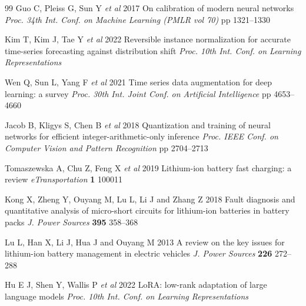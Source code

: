 \documentclass[12pt]{iopjournal}
\begin{document}
\begin{thebibliography}{99}
 Guo C, Pleiss G, Sun Y \textit{et al} 2017 On calibration of modern neural networks \textit{Proc. 34th Int. Conf. on Machine Learning (PMLR vol 70)} pp 1321--1330

 Kim T, Kim J, Tae Y \textit{et al} 2022 Reversible instance normalization for accurate time-series forecasting against distribution shift \textit{Proc. 10th Int. Conf. on Learning Representations}

 Wen Q, Sun L, Yang F \textit{et al} 2021 Time series data augmentation for deep learning: a survey \textit{Proc. 30th Int. Joint Conf. on Artificial Intelligence} pp 4653--4660

 Jacob B, Kligys S, Chen B \textit{et al} 2018 Quantization and training of neural networks for efficient integer-arithmetic-only inference \textit{Proc. IEEE Conf. on Computer Vision and Pattern Recognition} pp 2704--2713

 Tomaszewska A, Chu Z, Feng X \textit{et al} 2019 Lithium-ion battery fast charging: a review \textit{eTransportation} \textbf{1} 100011

 Kong X, Zheng Y, Ouyang M, Lu L, Li J and Zhang Z 2018 Fault diagnosis and quantitative analysis of micro-short circuits for lithium-ion batteries in battery packs \textit{J. Power Sources} \textbf{395} 358--368

 Lu L, Han X, Li J, Hua J and Ouyang M 2013 A review on the key issues for lithium-ion battery management in electric vehicles \textit{J. Power Sources} \textbf{226} 272--288

 Hu E J, Shen Y, Wallis P \textit{et al} 2022 LoRA: low-rank adaptation of large language models \textit{Proc. 10th Int. Conf. on Learning Representations}

\end{thebibliography}
\endgroup
\end{document}
